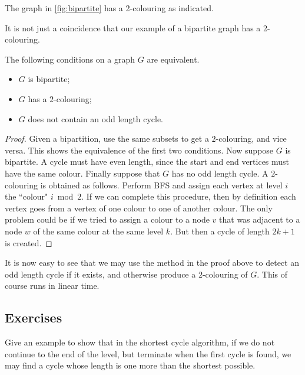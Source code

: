 \begin{Example}
The graph in \cref{fig:bipartite} has a 2-colouring as indicated.
\end{Example}

It is not just a coincidence that our example of a bipartite graph
has a 2-colouring.

\begin{Theorem} 
The following conditions on a graph $G$ are equivalent.
\begin{itemize}
\item
$G$ is bipartite;
\item
$G$ has a $2$-colouring;
\item
$G$ does not contain an odd length cycle.
\end{itemize}
\end{Theorem}

\begin{proof} 
Given a bipartition, use the same subsets to get a $2$-colouring, and
vice versa. This shows the equivalence of the first two conditions. Now
suppose $G$ is bipartite.  A cycle must have even length, since the start
and end vertices must have the same colour. Finally suppose that $G$
has no odd length cycle. A $2$-colouring is obtained as follows. Perform
BFS and assign each vertex at level $i$ the ``colour" $i \bmod 2$. If we
can complete this procedure, then by definition each vertex goes from
a vertex of one colour to one of another colour. The only problem could
be if we tried to assign a colour to a node $v$ that was adjacent to a
node $w$ of the same colour at the same level $k$. But then a cycle of
length $2k+1$ is created.
\end{proof}

It is now easy to see that we may use the method in the proof above
to detect an odd length cycle if it exists, and otherwise produce a
$2$-colouring of $G$. This of course runs in linear time.

\subsection*{Exercises}

\begin{Exercise}
\label{ex:shortest-cycle-thm}
Give an example to show that in the shortest cycle algorithm, if we
do not continue to the end of the level, but terminate when the first
cycle is found, we may find a cycle whose length is one more than the
shortest possible.
\end{Exercise}

